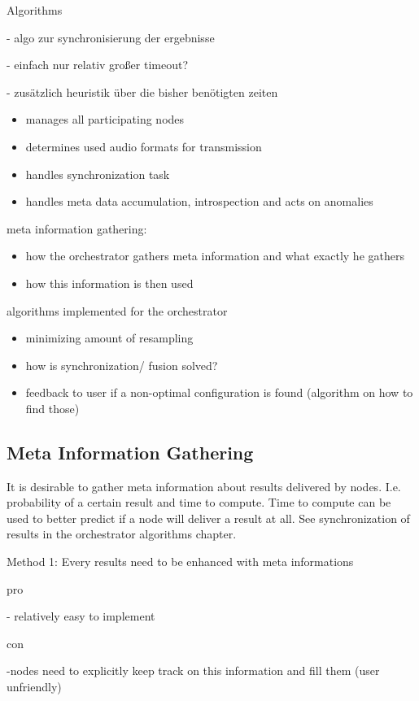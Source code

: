 Algorithms

- algo zur synchronisierung der ergebnisse 

- einfach nur relativ großer timeout?

- zusätzlich heuristik über die bisher benötigten zeiten


\begin{itemize}
	\item manages all participating nodes
	\item determines used audio formats for transmission
	\item handles synchronization task
	\item handles meta data accumulation, introspection and acts on anomalies
\end{itemize}

meta information gathering:

\begin{itemize}
	\item how the orchestrator gathers meta information and what exactly he gathers
	\item how this information is then used
\end{itemize}

algorithms implemented for the orchestrator

\begin{itemize}
	\item minimizing amount of resampling
	\item how is synchronization/ fusion solved?
	\item feedback to user if a non-optimal configuration is found (algorithm on how to find those)
\end{itemize}

\subsection{Meta Information Gathering}
It is desirable to gather meta information about results delivered by nodes. 
I.e. probability of a certain result and time to compute. 
Time to compute can be used to better predict if a node will deliver a result at all. 
See synchronization of results in the orchestrator algorithms chapter.

Method 1: Every results need to be enhanced with meta informations

pro

- relatively easy to implement

con

-nodes need to explicitly keep track on this information and fill them (user unfriendly)

